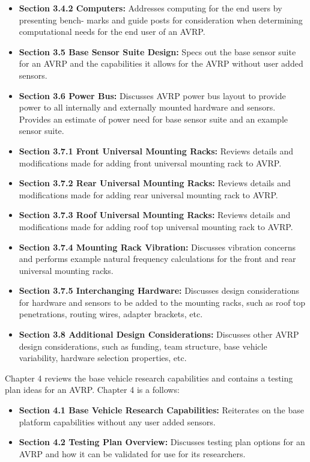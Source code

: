 \begin{itemize}
\item \textbf {Section 3.4.2 Computers:} Addresses computing for the end users by presenting bench- marks and guide posts for consideration when determining computational needs for the end user of an AVRP.
\item \textbf {Section 3.5 Base Sensor Suite Design:} Specs out the base sensor suite for an AVRP and the capabilities it allows for the AVRP without user added sensors.
\item \textbf {Section 3.6 Power Bus:} Discusses AVRP power bus layout to provide power to all internally and externally mounted hardware and sensors. Provides an estimate of power need for base sensor suite and an example sensor suite.
\item \textbf {Section 3.7.1 Front Universal Mounting Racks:} Reviews details and modifications made for adding front universal mounting rack to AVRP.
\item \textbf {Section 3.7.2 Rear Universal Mounting Racks:} Reviews details and modifications made for adding rear universal mounting rack to AVRP.
\item \textbf {Section 3.7.3 Roof Universal Mounting Racks:} Reviews details and modifications made for adding roof top universal mounting rack to AVRP.
\item \textbf {Section 3.7.4 Mounting Rack Vibration:} Discusses vibration concerns and performs example natural frequency calculations for the front and rear universal mounting racks.
\item \textbf {Section 3.7.5 Interchanging Hardware:} Discusses design considerations for hardware and sensors to be added to the mounting racks, such as roof top penetrations, routing wires, adapter brackets, etc.
\item \textbf {Section 3.8 Additional Design Considerations:} Discusses other AVRP design considerations, such as funding, team structure, base vehicle variability, hardware selection properties, etc.
\end{itemize}

Chapter 4 reviews the base vehicle research capabilities and contains a testing plan ideas for an AVRP. Chapter 4 is a follows:

\begin{itemize}
\item \textbf {Section 4.1 Base Vehicle Research Capabilities:} Reiterates on the base platform capabilities without any user added sensors.
\item \textbf {Section 4.2 Testing Plan Overview:} Discusses testing plan options for an AVRP and how it can be validated for use for its researchers.
\end{itemize}


